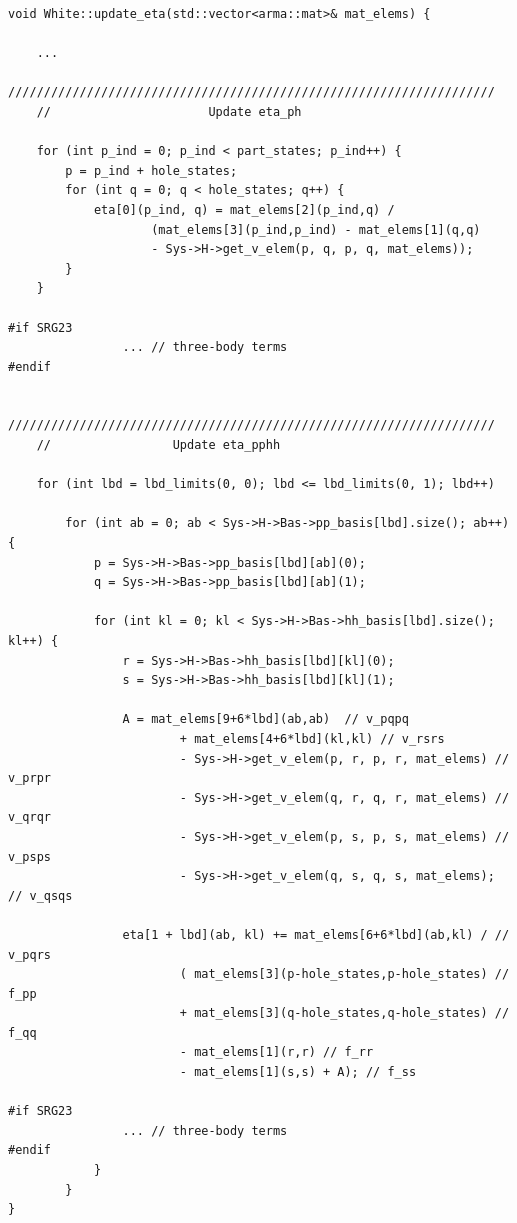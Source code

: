 \begin{lstlisting}[float,basicstyle=\footnotesize,caption={Updating all elements of the generator $\hat{\eta}$. The  matrix elements of the Hamiltonian are received in the array \textit{mat\_elems}, the $\hat{\eta}$-elements stored in the class variable \textit{eta}. As for Wegner's generator, we have the possibility of including the loop terms of three-body terms.},label={lst:white0}]
void White::update_eta(std::vector<arma::mat>& mat_elems) {

    ... 
    ////////////////////////////////////////////////////////////////////
    //                      Update eta_ph 
  
    for (int p_ind = 0; p_ind < part_states; p_ind++) {
        p = p_ind + hole_states;
        for (int q = 0; q < hole_states; q++) {
            eta[0](p_ind, q) = mat_elems[2](p_ind,q) /
                    (mat_elems[3](p_ind,p_ind) - mat_elems[1](q,q)
                    - Sys->H->get_v_elem(p, q, p, q, mat_elems));
        }
    }   
    
#if SRG23
				... // three-body terms
#endif   

    ////////////////////////////////////////////////////////////////////
    //                 Update eta_pphh

    for (int lbd = lbd_limits(0, 0); lbd <= lbd_limits(0, 1); lbd++) 
         
        for (int ab = 0; ab < Sys->H->Bas->pp_basis[lbd].size(); ab++) {          
            p = Sys->H->Bas->pp_basis[lbd][ab](0);
            q = Sys->H->Bas->pp_basis[lbd][ab](1);
            
            for (int kl = 0; kl < Sys->H->Bas->hh_basis[lbd].size(); kl++) {              
                r = Sys->H->Bas->hh_basis[lbd][kl](0);
                s = Sys->H->Bas->hh_basis[lbd][kl](1);

                A = mat_elems[9+6*lbd](ab,ab)  // v_pqpq
                        + mat_elems[4+6*lbd](kl,kl) // v_rsrs
                        - Sys->H->get_v_elem(p, r, p, r, mat_elems) // v_prpr
                        - Sys->H->get_v_elem(q, r, q, r, mat_elems) // v_qrqr
                        - Sys->H->get_v_elem(p, s, p, s, mat_elems) // v_psps
                        - Sys->H->get_v_elem(q, s, q, s, mat_elems); // v_qsqs

                eta[1 + lbd](ab, kl) += mat_elems[6+6*lbd](ab,kl) / // v_pqrs
                        ( mat_elems[3](p-hole_states,p-hole_states) // f_pp
                        + mat_elems[3](q-hole_states,q-hole_states) // f_qq
                        - mat_elems[1](r,r) // f_rr
                        - mat_elems[1](s,s) + A); // f_ss
                        
#if SRG23
				... // three-body terms
#endif    
            }
        }
}
\end{lstlisting}


